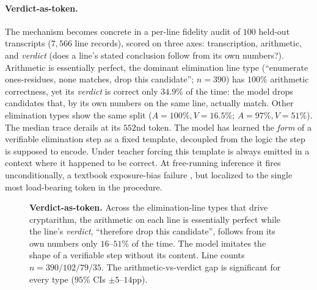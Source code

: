 \documentclass[11pt]{article}
\begin{document}
\paragraph{Verdict-as-token.} The mechanism becomes concrete in a per-line fidelity audit
of $100$ held-out transcripts ($7{,}566$ line records), scored on three axes: transcription,
arithmetic, and \emph{verdict} (does a line's stated conclusion follow from its own
numbers?). Arithmetic is essentially perfect, the dominant elimination line type
(``enumerate ones-residues, none matches, drop this candidate''; $n=390$) has $100\%$
arithmetic correctness, yet its \emph{verdict} is correct only $34.9\%$ of the time: the
model drops candidates that, by its own numbers on the same line, actually match. Other
elimination types show the same split ($A{=}100\%, V{=}16.5\%$; $A{=}97\%, V{=}51\%$). The
median trace derails at its $552$nd token. The model has learned the \emph{form} of a
verifiable elimination step as a fixed template, decoupled from the logic the step is
supposed to encode. Under teacher forcing this template is always emitted in a context
where it happened to be correct. At free-running inference it fires unconditionally, a
textbook exposure-bias failure \citep{bengio2015scheduled, ranzato2016sequence}, but
localized to the single most load-bearing token in the procedure.

\begin{figure}[tbp]
\centering
{}
\caption{\textbf{Verdict-as-token.} Across the elimination-line types that drive
cryptarithm, the arithmetic on each line is essentially perfect while the line's
\emph{verdict}, ``therefore drop this candidate'', follows from its own numbers only
$16$--$51\%$ of the time. The model imitates the shape of a verifiable step without its
content. Line counts $n=390/102/79/35$. The arithmetic-vs-verdict gap is significant for
every type ($95\%$ CIs $\pm5$--$14$pp).}
\label{fig:fidelity}
\end{figure}
\end{document}

